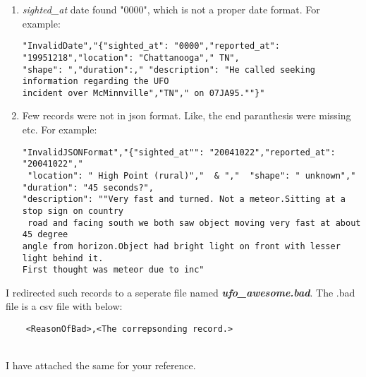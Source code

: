 \documentclass{article}
\begin{document}
	\begin{enumerate}
		\item \emph{sighted\_at} date found "0000", which is not a proper date format. For example:\\
\begin{BVerbatim}
"InvalidDate","{"sighted_at": "0000","reported_at": "19951218","location": "Chattanooga"," TN",
"shape": ","duration":," "description": "He called seeking information regarding the UFO 
incident over McMinnville","TN"," on 07JA95.""}"	
\end{BVerbatim}
		\item Few records were not in json format. Like, the end paranthesis were missing etc. For example:\\
\begin{BVerbatim}
"InvalidJSONFormat","{"sighted_at"": "20041022","reported_at": "20041022","
 "location": " High Point (rural)","  & ","  "shape": " unknown"," "duration": "45 seconds?",
"description": ""Very fast and turned. Not a meteor.Sitting at a stop sign on country
 road and facing south we both saw object moving very fast at about 45 degree 
angle from horizon.Object had bright light on front with lesser light behind it. 
First thought was meteor due to inc"
\end{BVerbatim}
	\end{enumerate}		
	I redirected such records to a seperate file named \textbf{\emph{ufo\_awesome.bad}}. The .bad file is a csv file with below:\\
\begin{BVerbatim}
	<ReasonOfBad>,<The correpsonding record.>
\end{BVerbatim}
\\ I have attached the same for your reference. \\
\end{document}
